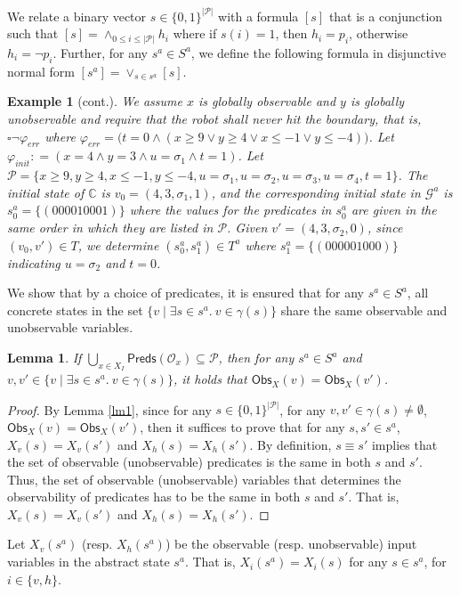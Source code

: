 \documentclass[letterpaper, 10 pt, conference]{ieeeconf}
\newtheorem{lemma}{Lemma}
\newtheorem{example}{Example}
\providecommand{\abs}[1]{\lvert#1\rvert}
\begin{document}
We relate a binary vector $s \in \{0,1\}^{\abs{\mathcal{P}}}$ with a formula $[s]$ that is a conjunction such that 
$[s] = \land_{0\le i \le \abs{\mathcal{P}}} h_i $ where if $s(i)=1$,
then $h_i = p_i$, otherwise $h_i = \neg p_i$. 
Further, for any $ s^a \in S^a$, we define the following formula in disjunctive normal
form $[s^a] =\lor_{s\in s^a} [s]$.

\addtocounter{example}{-1}
\begin{example}[cont.]We assume $x$ is globally
  observable and $y$ is globally unobservable and require
  that the robot shall never hit the boundary, that is, $\square \neg
  \varphi_{err}$ where $\varphi_{err} = \big(t =0\land (x\ge 9 \lor y
  \ge 4 \lor x \le -1 \lor y \le -4 ) \big)$. Let $\varphi_{init}: = (x= 4 \land y= 3 \land u = \sigma_1 \land t = 1)$.
 Let $\mathcal{P}= \{
  x\ge 9, y \ge 4, x \le -1, y\le -4, u=\sigma_1,
  u=\sigma_2,u=\sigma_3,u=\sigma_4, t=1\}$. The initial state of
  $\mathbb{C}$ is $v_0 =(4, 3, \sigma_1, 1)$, and the corresponding
  initial state in $\mathcal{G}^a$ is $s^a_0 =\{ (00001 000 1) \}$
  where the values for the predicates in $s^a_0$ are given in the same
  order in which they are listed in $\mathcal{P}$. Given $v'= (4, 3 ,
  \sigma_2, 0)$, since $(v_0,v')\in T$, we determine $(s^a_0 ,s^a_1)
  \in T^a$ where $s^a_1= \{ (000 0 01000)\} $ indicating $u=\sigma_2$
  and $t=0$.
\end{example}
We show that by a choice of predicates, it is ensured that for any
$s^a \in S^a$, all concrete states in the set $ \{v\mid \exists s\in
s^a.\ v\in \gamma(s)\}$ share the same observable and unobservable
variables.
\begin{lemma}
  If $\bigcup_{x\in X_I} \mathsf{Preds} (\mathcal{O}_x)\subseteq
  \mathcal{P}$, then for any $s^a\in S^a$ and $v,v'\in \{v\mid
  \exists s\in s^a.\ v\in \gamma(s)\}$, it holds that
  $\mathsf{Obs}_X(v)=\mathsf{Obs}_X(v')$.
\end{lemma}
\begin{proof}
  By Lemma \ref{lm1}, since for any $s\in
  \{0,1\}^{\abs{\mathcal{P}}}$, for any $v,v' \in \gamma(s) \ne
  \emptyset$, $\mathsf{Obs}_X(v)=\mathsf{Obs}_X(v')$, then it suffices to
  prove that for any $s,s'\in s^a$, $X_v(s)=X_v(s')$ and
  $X_h(s)=X_h(s')$. By definition, $s \equiv s'$ implies that the set
  of observable (unobservable) predicates is the same in both $s$ and
  $s'$. Thus, the set of observable (unobservable) variables that
  determines the observability of predicates has to be the same in both $s$ and $s'$. That is, $X_v(s)=X_v(s')$ and $X_h(s)=X_h(s')$.
\end{proof}Let $X_v(s^a)$ (resp. $X_h(s^a)$) be the
observable (resp. unobservable) input variables in the abstract  state
$s^a$. That is, $X_i(s^a)=X_i(s)$ for any $s\in s^a$, for $i\in \{v,
h\}$.
\end{document}
